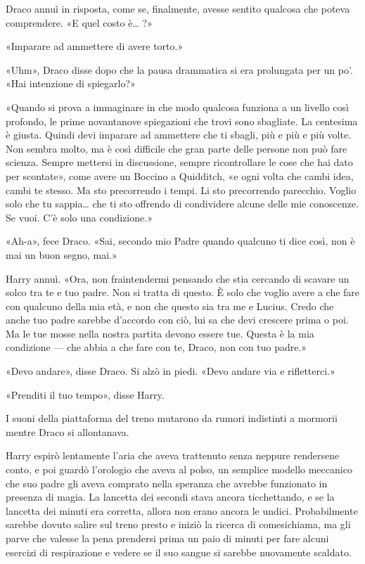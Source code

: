 Draco annuì in risposta, come se, finalmente, avesse sentito qualcosa che poteva comprendere. «E quel costo è… ?»

«Imparare ad ammettere di avere torto.»

«Uhm», Draco disse dopo che la pausa drammatica si era prolungata per un po’. «Hai intenzione di spiegarlo?»

«Quando si prova a immaginare in che modo qualcosa funziona a un livello così profondo, le prime novantanove spiegazioni che trovi sono sbagliate. La centesima è giusta. Quindi devi imparare ad ammettere che ti sbagli, più e più e più volte. Non sembra molto, ma è così difficile che gran parte delle persone non può fare scienza. Sempre mettersi in discussione, sempre ricontrollare le cose che hai dato per scontate», come avere un Boccino a Quidditch, «e ogni volta che cambi idea, cambi te stesso. Ma sto precorrendo i tempi. Li sto precorrendo parecchio. Voglio solo che tu sappia… che ti sto offrendo di condividere alcune delle mie conoscenze. Se vuoi. C’è solo una condizione.»

«Ah-a», fece Draco. «Sai, secondo mio Padre quando qualcuno ti dice così, non è mai un buon segno, mai.»

Harry annuì. «Ora, non fraintendermi pensando che stia cercando di scavare un solco tra te e tuo padre. Non si tratta di questo. È solo che voglio avere a che fare con qualcuno della mia età, e non che questo sia tra me e Lucius. Credo che anche tuo padre sarebbe d’accordo con ciò, lui sa che devi crescere prima o poi. Ma le tue mosse nella nostra partita devono essere tue. Questa è la mia condizione — che abbia a che fare con te, Draco, non con tuo padre.»

«Devo andare», disse Draco. Si alzò in piedi. «Devo andare via e rifletterci.»

«Prenditi il tuo tempo», disse Harry.

I suoni della piattaforma del treno mutarono da rumori indistinti a mormorii mentre Draco si allontanava.

Harry espirò lentamente l’aria che aveva trattenuto senza neppure rendersene conto, e poi guardò l’orologio che aveva al polso, un semplice modello meccanico che suo padre gli aveva comprato nella speranza che avrebbe funzionato in presenza di magia. La lancetta dei secondi stava ancora ticchettando, e se la lancetta dei minuti era corretta, allora non erano ancora le undici. Probabilmente sarebbe dovuto salire sul treno presto e iniziò la ricerca di comesichiama, ma gli parve che valesse la pena prendersi prima un paio di minuti per fare alcuni esercizi di respirazione e vedere se il suo sangue si sarebbe nuovamente scaldato.

